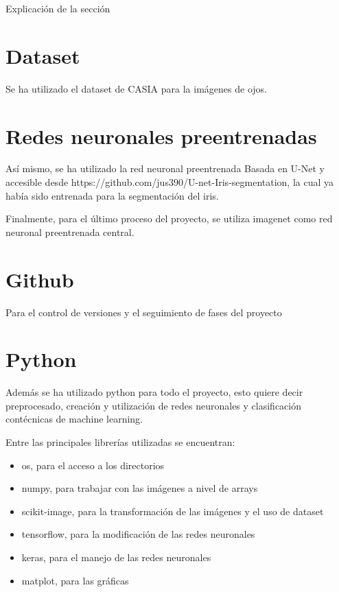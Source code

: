
Explicación de la sección

\section{Dataset}

Se ha utilizado el dataset de CASIA para la imágenes de ojos.

\section{Redes neuronales preentrenadas}

Así mismo, se ha utilizado la red neuronal preentrenada Basada en U-Net y accesible desde https://github.com/jus390/U-net-Iris-segmentation, la cual ya había sido
entrenada para la segmentación del iris.

Finalmente, para el último proceso del proyecto, se utiliza imagenet como red neuronal preentrenada central.

\section{Github}
Para el control de versiones y el seguimiento de fases del proyecto

\section{Python}

Además se ha utilizado python para todo el proyecto, esto quiere decir preprocesado, creación y utilización de redes neuronales y clasificación contécnicas de 
machine learning.

Entre las principales librerías utilizadas se encuentran:

\begin{itemize}
    \item os, para el acceso a los directorios
    \item numpy, para trabajar con las imágenes a nivel de arrays
    \item scikit-image, para la transformación de las imágenes y el uso de dataset
    \item tensorflow, para la modificación de las redes neuronales
    \item keras, para el manejo de las redes neuronales
    \item matplot, para las gráficas
\end{itemize}

